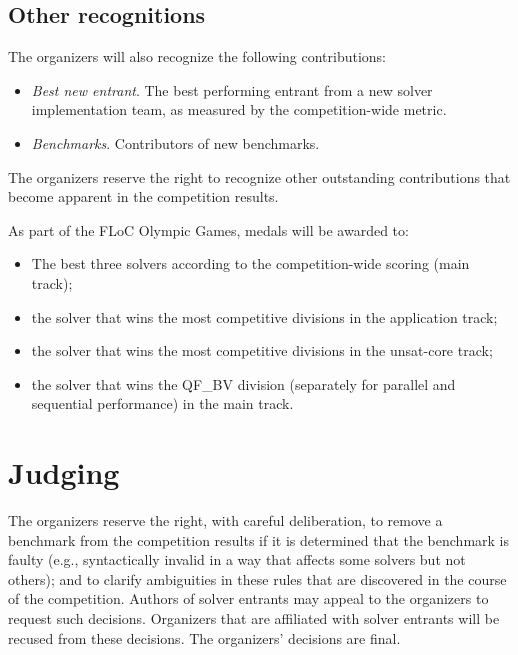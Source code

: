 \documentclass[12pt]{article}
\begin{document}
\subsection{Other recognitions}

The organizers will also recognize the following contributions:
%
\begin{itemize}
\item \emph{Best new entrant}. The best performing entrant from a new
  solver implementation team, as measured by the competition-wide
  metric.
\item \emph{Benchmarks}. Contributors of new benchmarks.
\end{itemize}
%
The organizers reserve the right to recognize other outstanding
contributions that become apparent in the competition results.

As part of the FLoC Olympic Games, medals will be awarded to:
%
\begin{itemize}
\item The best three solvers according to the competition-wide scoring
  (main track);
\item the solver that wins the most competitive divisions in the
  application track;
\item the solver that wins the most competitive divisions in the
  unsat-core track;
\item the solver that wins the QF\_BV division (separately for
  parallel and sequential performance) in the main track.
\end{itemize}


\section{Judging}

The organizers reserve the right, with careful deliberation, to remove
a benchmark from the competition results if it is determined that the
benchmark is faulty (e.g., syntactically invalid in a way that affects
some solvers but not others); and to clarify ambiguities in these
rules that are discovered in the course of the competition.  Authors
of solver entrants may appeal to the organizers to request such
decisions.  Organizers that are affiliated with solver entrants will
be recused from these decisions.  The organizers' decisions are final.

\end{document}
